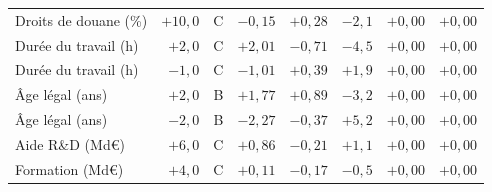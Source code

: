 {\begin{longtable}{p{4.2cm}rcrrrrr}
Droits de douane (\%) & $+10{,}0$ & C & $-0{,}15$ & $+0{,}28$ & $-2{,}1$ & $+0{,}00$ & $+0{,}00$\\
Durée du travail (h) & $+2{,}0$ & C & $+2{,}01$ & $-0{,}71$ & $-4{,}5$ & $+0{,}00$ & $+0{,}00$\\
Durée du travail (h) & $-1{,}0$ & C & $-1{,}01$ & $+0{,}39$ & $+1{,}9$ & $+0{,}00$ & $+0{,}00$\\
Âge légal (ans) & $+2{,}0$ & B & $+1{,}77$ & $+0{,}89$ & $-3{,}2$ & $+0{,}00$ & $+0{,}00$\\
Âge légal (ans) & $-2{,}0$ & B & $-2{,}27$ & $-0{,}37$ & $+5{,}2$ & $+0{,}00$ & $+0{,}00$\\
Aide R\&D (Md€) & $+6{,}0$ & C & $+0{,}86$ & $-0{,}21$ & $+1{,}1$ & $+0{,}00$ & $+0{,}00$\\
Formation (Md€) & $+4{,}0$ & C & $+0{,}11$ & $-0{,}17$ & $-0{,}5$ & $+0{,}00$ & $+0{,}00$\\\bottomrule\end{longtable}}